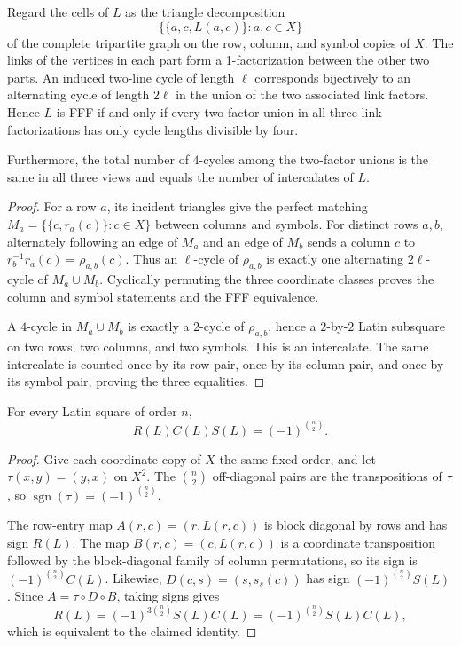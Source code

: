 \begin{proposition}
\label{prop:tripartite-links}
Regard the cells of $L$ as the triangle decomposition
\[
 \bigl\{\{a,c,L(a,c)\}:a,c\in X\bigr\}
\]
of the complete tripartite graph on the row, column, and symbol copies of
$X$.  The links of the vertices in each part form a 1-factorization between
the other two parts.  An induced two-line cycle of length $\ell$ corresponds
bijectively to an alternating cycle of length $2\ell$ in the union of the two
associated link factors.  Hence $L$ is FFF if and only if every two-factor
union in all three link factorizations has only cycle lengths divisible by
four.

Furthermore, the total number of $4$-cycles among the two-factor unions is
the same in all three views and equals the number of intercalates of $L$.
\end{proposition}

\begin{proof}
For a row $a$, its incident triangles give the perfect matching
$M_a=\{\{c,r_a(c)\}:c\in X\}$ between columns and symbols.  For distinct
rows $a,b$, alternately following an edge of $M_a$ and an edge of $M_b$
sends a column $c$ to $r_b^{-1}r_a(c)=\rho_{a,b}(c)$.  Thus an $\ell$-cycle
of $\rho_{a,b}$ is exactly one alternating $2\ell$-cycle of
$M_a\cup M_b$.  Cyclically permuting the three coordinate classes proves the
column and symbol statements and the FFF equivalence.

A $4$-cycle in $M_a\cup M_b$ is exactly a $2$-cycle of $\rho_{a,b}$, hence a
$2$-by-$2$ Latin subsquare on two rows, two columns, and two symbols.  This is
an intercalate.  The same intercalate is counted once by its row pair, once by
its column pair, and once by its symbol pair, proving the three equalities.
\end{proof}

\begin{lemma}
\label{lem:global-three-view-sign}
For every Latin square of order $n$,
\[
 R(L)C(L)S(L)=(-1)^{\binom n2}.
\]
\end{lemma}

\begin{proof}
Give each coordinate copy of $X$ the same fixed order, and let
$\tau(x,y)=(y,x)$ on $X^2$.  The $\binom n2$ off-diagonal pairs are the
transpositions of $\tau$, so
$\operatorname{sgn}(\tau)=(-1)^{\binom n2}$.

The row-entry map $A(r,c)=(r,L(r,c))$ is block diagonal by rows and has sign
$R(L)$.  The map $B(r,c)=(c,L(r,c))$ is a coordinate transposition followed
by the block-diagonal family of column permutations, so its sign is
$(-1)^{\binom n2}C(L)$.  Likewise, $D(c,s)=(s,s_s(c))$ has sign
$(-1)^{\binom n2}S(L)$.  Since $A=\tau\circ D\circ B$, taking signs gives
\[
 R(L)=(-1)^{3\binom n2}S(L)C(L)
      =(-1)^{\binom n2}S(L)C(L),
\]
which is equivalent to the claimed identity.
\end{proof}

